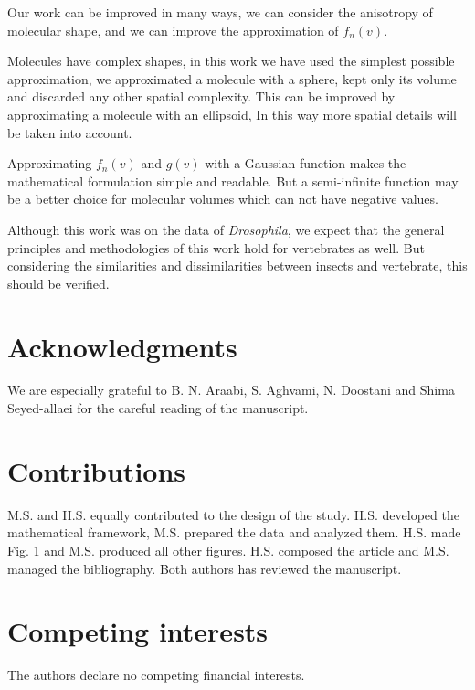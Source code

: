 \documentclass[11pt]{paper} %
\begin{document}
Our work can be improved in many ways, we can consider the anisotropy of molecular shape, and we can improve the approximation of $f_n(v)$. 

Molecules have complex shapes, 
in this work we have used the simplest possible approximation, 
we approximated a molecule with a sphere, 
kept only its volume and discarded any other spatial complexity. 
This can be improved by approximating a molecule with an ellipsoid, 
In this way more spatial details will be taken into account. 

Approximating $f_n(v)$ and $g(v)$ with a Gaussian function makes the mathematical formulation simple and readable. 
But a semi-infinite function may be a better choice for molecular volumes which can not have negative values.

Although this work was on the data of \textit{Drosophila}, 
we expect that the general principles and methodologies of this work hold for vertebrates as well. 
But considering the similarities and dissimilarities between insects and vertebrate, 
this should be verified.


\section*{Acknowledgments}
We are especially grateful to B. N. Araabi, S. Aghvami, N. Doostani and Shima Seyed-allaei for the careful reading of the manuscript.

\printbibliography

%

%


\section*{Contributions}

M.S. and H.S. equally contributed to the design of the study. H.S. developed the mathematical framework, M.S. prepared the data and analyzed them. H.S. made Fig. 1 and M.S. produced all other figures. H.S. composed the article and M.S. managed the bibliography. Both authors has reviewed the manuscript.

\section*{Competing interests}
The authors declare no competing financial interests.
\end{document}
